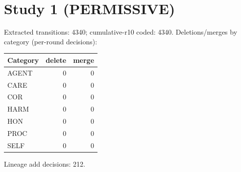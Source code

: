 \section{Study 1 (PERMISSIVE)}\label{app:study1}
Extracted transitions: 4340;
cumulative-r10 coded: 4340.
Deletions/merges by category (per-round decisions):
\begin{tabular}{lrr}
\toprule Category & delete & merge \\
\midrule
AGENT & 0 & 0 \\
CARE & 0 & 0 \\
COR & 0 & 0 \\
HARM & 0 & 0 \\
HON & 0 & 0 \\
PROC & 0 & 0 \\
SELF & 0 & 0 \\
\bottomrule
\end{tabular}

Lineage add decisions: 212.
